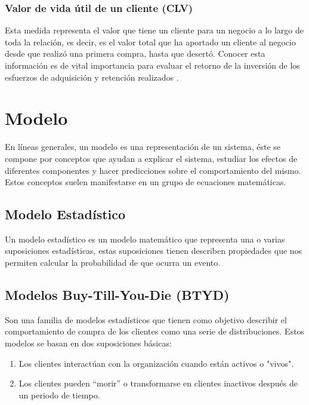 \subsubsection{Valor de vida útil de un cliente (CLV)}

Esta medida representa el valor que tiene un cliente para un negocio a lo largo de toda la relación, es decir, es el valor total que ha aportado un cliente al negocio desde que realizó una primera compra, hasta que desertó. Conocer esta información es de vital importancia para evaluar el retorno de la inversión de los esfuerzos de adquisición y retención realizados \cite{gold2020}.

\section{Modelo}

En líneas generales, un modelo es una representación de un sistema, éste se compone por conceptos que ayudan a explicar el sistema, estudiar los efectos de diferentes componentes y hacer predicciones sobre el comportamiento del mismo. Estos conceptos suelen manifestarse en un grupo de ecuaciones matemáticas.

\subsection{Modelo Estadístico}

Un modelo estadístico es un modelo matemático que representa una o varias suposiciones estadísticas, estas suposiciones tienen describen propiedades que nos permiten calcular la probabilidad de que ocurra un evento.

\subsection{Modelos Buy-Till-You-Die (BTYD)}

Son una familia de modelos estadísticos que tienen como objetivo describir el comportamiento de compra de los clientes como una serie de distribuciones. Estos modelos se basan en dos suposiciones básicas:

\begin{enumerate}
	\item Los clientes interactúan con la organización cuando están activos o "vivos".
	\item Los clientes pueden “morir” o transformarse en clientes inactivos después de un periodo de tiempo.
\end{enumerate}

